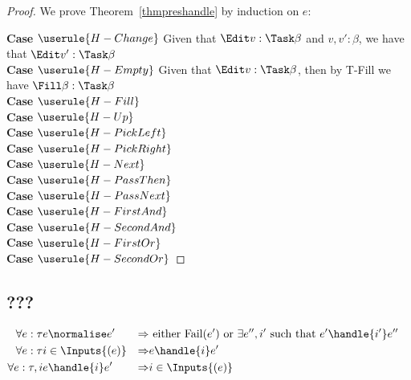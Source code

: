 \begin{proof}
  We prove Theorem~\ref{thmpreshandle} by induction on $e$:

  \noindent\textbf{Case} $\userule{H-Change}$ Given that $\Edit v:\Task\beta$ and $v,v':\beta$, we have that $\Edit v':\Task\beta$\\

  \noindent\textbf{Case} $\userule{H-Empty}$ Given that $\Edit v:\Task\beta$, then by T-Fill we have $\Fill \beta:\Task\beta$ \\

  \noindent\textbf{Case} $\userule{H-Fill}$ \\

  \noindent\textbf{Case} $\userule{H-Up}$ \\

  \noindent\textbf{Case} $\userule{H-PickLeft}$ \\

  \noindent\textbf{Case} $\userule{H-PickRight}$ \\

  \noindent\textbf{Case} $\userule{H-Next}$ \\

  \noindent\textbf{Case} $\userule{H-PassThen}$ \\

  \noindent\textbf{Case} $\userule{H-PassNext}$ \\

  \noindent\textbf{Case} $\userule{H-FirstAnd}$ \\

  \noindent\textbf{Case} $\userule{H-SecondAnd}$ \\

  \noindent\textbf{Case} $\userule{H-FirstOr}$ \\

  \noindent\textbf{Case} $\userule{H-SecondOr}$
\end{proof}
\subsection{???}

\begin{align*}
  \forall e:\tau & e \normalise e' &\implies& \text{ either Fail}(e') \text{ or } \exists e'',i' \text{ such that } e'\handle{i'}e''&\\
  \forall e:\tau & i\in\Inputs{(e)} &\implies& e\handle{i}e'\\
  \forall e:\tau, i & e\handle{i}e' &\implies& i\in\Inputs{(e)}
\end{align*}

